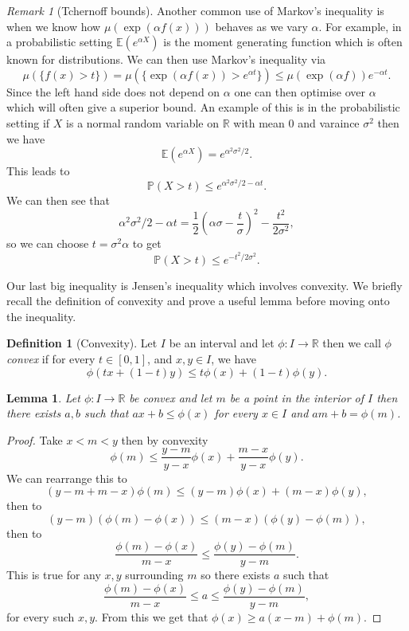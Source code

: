 \documentclass[11pt]{article}
\newtheorem{lem}[thm]{Lemma}
\theoremstyle{definition}
\newtheorem{dfn}[thm]{Definition}
\theoremstyle{remark}
\newtheorem{remark}[thm]{Remark}
\begin{document}
\begin{remark}[Tchernoff bounds]
Another common use of Markov's inequality is when we know how $\mu( \exp( \alpha f(x)))$ behaves as we vary $\alpha$. For example, in a probabilistic setting $\mathbb{E}(e^{\alpha X})$ is the moment generating function which is often known for distributions. We can then use Markov's inequality via
\[ \mu(\{f(x)> t\}) = \mu( \{ \exp(\alpha f(x)) > e^{\alpha t} \} ) \leq \mu(\exp(\alpha f)) e^{-\alpha t}. \] Since the left hand side does not depend on $\alpha$ one can then optimise over $\alpha$ which will often give a superior bound. An example of this is in the probabilistic setting if $X$ is a normal random variable on $\mathbb{R}$ with mean 0 and varaince $\sigma^2$ then we have
\[ \mathbb{E}\left( e^{\alpha X}\right) = e^{\alpha^2 \sigma^2/2}. \] This leads to
\[ \mathbb{P}(X> t) \leq e^{\alpha^2 \sigma^2/2-\alpha t}. \] We can then see that
\[ \alpha^2 \sigma^2/2 - \alpha t = \frac{1}{2}\left(\alpha \sigma - \frac{t}{ \sigma} \right)^2 - \frac{t^2}{2 \sigma^2}, \] so we can choose $t= \sigma^2 \alpha$ to get
\[ \mathbb{P}(X > t) \leq e^{-t^2/2\sigma^2}.  \]
\end{remark}

Our last big inequality is Jensen's inequality which involves convexity. We briefly recall the definition of convexity and prove a useful lemma before moving onto the inequality. 

\begin{dfn}[Convexity]
Let $I$ be an interval and let $\phi: I \rightarrow \mathbb{R}$ then we call $\phi$ \emph{convex} if for every $t \in [0,1]$, and $x,y \in I$, we have
\[ \phi(tx +(1-t)y) \leq t\phi(x) + (1-t)\phi(y).\]
\end{dfn}

\begin{lem}
Let $\phi: I \rightarrow \mathbb{R}$ be convex and let $m$ be a point in the interior of $I$ then there exists $a,b$ such that $ax+b \leq \phi(x)$ for every $x \in I$ and $am+b = \phi(m)$.
\end{lem}
\begin{proof}
Take $x<m<y$ then by convexity
\[ \phi(m) \leq \frac{y-m}{y-x} \phi(x) + \frac{m-x}{y-x} \phi(y). \] We can rearrange this to
\[ (y-m + m-x) \phi(m) \leq (y-m) \phi(x) + (m-x) \phi(y), \] then to
\[ (y-m)(\phi(m)-\phi(x)) \leq (m-x)(\phi(y)-\phi(m)), \] then to
\[ \frac{\phi(m)-\phi(x)}{m-x} \leq \frac{\phi(y)-\phi(m)}{y-m}. \] This is true for any $x,y$ surrounding $m$ so there exists $a$ such that
\[  \frac{\phi(m)-\phi(x)}{m-x} \leq a \leq \frac{\phi(y)-\phi(m)}{y-m}, \] for every such $x,y$. From this we get that $\phi(x) \geq a(x-m) + \phi(m)$.
\end{proof}
\end{document}
